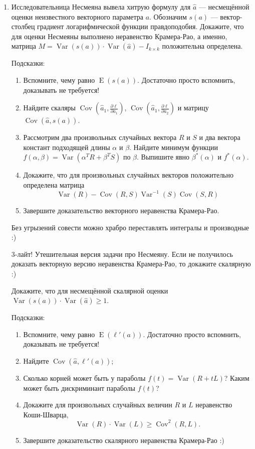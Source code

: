 \documentclass[12pt]{article}
\DeclareMathOperator{\Cov}{Cov}
\DeclareMathOperator{\Var}{Var}
\DeclareMathOperator{\E}{E}
\begin{document}
\begin{enumerate}[resume]


  \item Исследовательница Несмеяна вывела хитрую формулу для $\hat a$ — несмещённой оценки неизвестного векторного параметра $a$.  
    Обозначим $s(a)$ — вектор-столбец градиент логарифмической функции правдоподобия. Докажите, что для оценки Несмеяны выполнено неравенство Крамера-Рао,
    а именно, матрица $M = \Var(s(a))\cdot \Var(\hat a) - I_{k\times k}$ положительна определена. 

     

Подсказки:

    \begin{enumerate}
      \item Вспомните, чему равно $\E(s(a))$. Достаточно просто вспомнить, доказывать не требуется!
      \item Найдите скаляры $\Cov\left(\hat a_1, \frac{\partial \ell}{\partial a_1}\right)$, 
	$\Cov\left(\hat a_1, \frac{\partial \ell}{\partial a_2}\right)$ 
	и матрицу $\Cov\left(\hat a, s(a) \right)$.
      \item Рассмотрим два произвольных случайных вектора $R$ и $S$ и два вектора констант подходящей длины $\alpha$ и $\beta$. 
	Найдите минимум функции $f(\alpha, \beta) = \Var(\alpha^T R + \beta^T S)$ по $\beta$. 
	Выпишите явно $\beta^*(\alpha)$ и $f^*(\alpha)$.
      \item Докажите, что для произвольных случайных векторов положительно определена матрица 
	\[
          \Var(R) - \Cov(R, S) \Var^{-1}(S)\Cov(S, R)
	\]
      \item Завершите доказательство векторного неравенства Крамера-Рао. 


    \end{enumerate}

  Без угрызений совести можно храбро переставлять интегралы и производные :)

  \newpage
  \item[3-лайт!] Утешительная версия задачи про Несмеяну. Если не получилось доказать векторную версию неравенства Крамера-Рао, то докажите скалярную :)

    Докажите, что для несмещённой скалярной оценки  $\Var(s(a))\cdot \Var(\hat a) \geq 1$.

    Подсказки:
	
    \begin{enumerate}
     
      \item Вспомните, чему равно $\E(\ell'(a))$. Достаточно просто вспомнить, доказывать не требуется!
      \item Найдите $\Cov(\hat a, \ell'(a))$;
      \item Сколько корней может быть у параболы $f(t)=\Var(R + tL)$? Каким может быть дискриминант параболы $f(t)$?
      \item  Докажите для произвольных случайных величин $R$ и $L$ неравенство Коши-Шварца, 
	\[
	  \Var(R) \cdot \Var(L) \geq \Cov^2(R, L) .
	\]
    \item Завершите доказательство скалярного неравенства Крамера-Рао :)
    \end{enumerate}



\end{enumerate}
\end{document}
